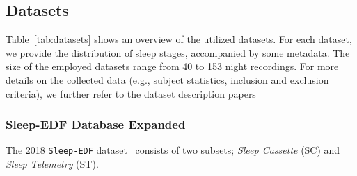 \documentclass[runningheads]{llncs}
\begin{document}
\subsection{Datasets}
Table~\ref{tab:datasets} shows an overview of the utilized datasets. For each dataset, we provide the distribution of sleep stages, accompanied by some metadata. The size of the employed datasets range from 40 to 153 night recordings. For more details on the collected data (e.g., subject statistics, inclusion and exclusion criteria), we further refer to the dataset description papers~\cite{sleepedf,o2014montrealmass}

\begin{table}[htp]
\centering
\caption{The distribution of sleep stages of each dataset. For \texttt{SC-EDF-20} and \texttt{SC-EDF-78}, the wake periods were trimmed to 30 minutes before and after the sleep period. The \textit{\# p} and \textit{\# r} columns refer respectively to the number of patients and recordings.}
\label{tab:datasets}
\end{table}

\subsubsection{Sleep-EDF Database Expanded} The 2018 \texttt{Sleep-EDF} dataset~\cite{sleepedf} consists of two subsets; \textit{Sleep Cassette} (SC) and \textit{Sleep Telemetry} (ST). 
\end{document}
